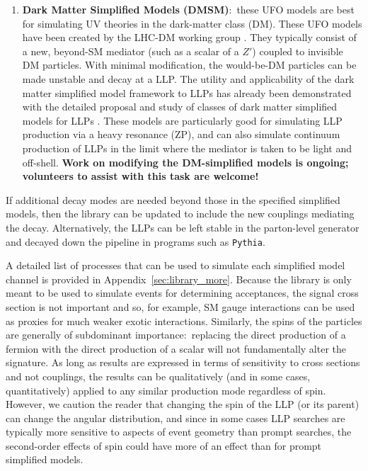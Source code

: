 \begin{enumerate}
\item {\bf Dark Matter Simplified Models (DMSM)}:~these UFO models are best for simulating UV theories in the dark-matter class (DM). These UFO models have been created by the LHC-DM working group \cite{Abdallah:2015ter}. They typically consist of a new, beyond-SM mediator (such as a scalar of a $Z'$) coupled to invisible DM particles. With minimal modification, the would-be-DM particles can be made unstable and decay at a LLP. The utility and applicability of the dark matter simplified model framework to LLPs has already been demonstrated with the detailed proposal and study of classes of dark matter simplified models for LLPs \cite{Buchmueller:2017uqu}.  These models are particularly good for simulating LLP production via a heavy resonance (ZP), and can also simulate continuum production of LLPs in the limit where the mediator is taken to be light and off-shell. {\bf Work on modifying the DM-simplified models is ongoing; volunteers to assist with this task are welcome!}

\end{enumerate}
%
If additional decay modes are needed beyond those in the specified simplified models, then the library can be updated to include the new couplings mediating the decay. Alternatively, the LLPs can be left stable in the parton-level generator and decayed down the pipeline in programs such as \texttt{Pythia}.

A detailed list of processes that can be used to simulate each simplified model channel is provided in Appendix~\ref{sec:library_more}. Because the library is only meant to be used to simulate events for determining acceptances, the signal cross section is not important and so, for example, SM gauge interactions can be used as proxies for much weaker exotic interactions. Similarly, the spins of the particles are generally of subdominant importance:~replacing the direct production of a fermion with the direct production of a scalar will not fundamentally alter the signature. As long as results are expressed in terms of sensitivity to cross sections and not couplings, the results can be qualitatively (and in some cases, quantitatively) applied to any similar production mode regardless of spin. However, we caution the reader that changing the spin of the LLP (or its parent) can change the angular distribution, and since in some cases LLP searches are typically more sensitive to aspects of event geometry than prompt searches, the second-order effects of spin could have more of an effect than for prompt simplified models.

